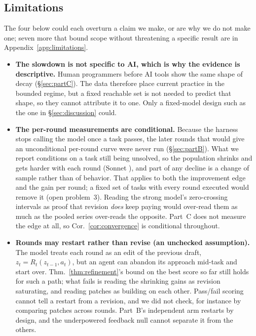 \documentclass{article}
\theoremstyle{remark}
\theoremstyle{plain}
\begin{document}
\subsection{Limitations}
\label{sec:limitations}

The four below could each overturn a claim we make, or are why we do not make one; seven more that bound scope without threatening a specific result are in Appendix~\ref{app:limitations}.

\begin{itemize}[leftmargin=*,itemsep=1pt]
    \item \textbf{The slowdown is not specific to AI, which is why the evidence is descriptive.} Human programmers before AI tools show the same shape of decay (\S\ref{sec:partC}). The data therefore place current practice in the bounded regime, but a fixed reachable set is not needed to predict that shape, so they cannot attribute it to one. Only a fixed-model design such as the one in \S\ref{sec:discussion} could.
    \item \textbf{The per-round measurements are conditional.} Because the harness stops calling the model once a task passes, the later rounds that would give an unconditional per-round curve were never run (\S\ref{sec:partB}). What we report conditions on a task still being unsolved, so the population shrinks and gets harder with each round (Sonnet \statPBSonnetHeadroomN), and part of any decline is a change of sample rather than of behavior. That applies to both the improvement edge and the gain per round; a fixed set of tasks with every round executed would remove it (open problem~3). Reading the strong model's zero-crossing intervals as proof that revision \emph{does} keep paying would over-read them as much as the pooled series over-reads the opposite. Part~C does not measure the edge at all, so Cor.~\ref{cor:convergence} is conditional throughout.
    \item \textbf{Rounds may restart rather than revise (an unchecked assumption).} The model treats each round as an edit of the previous draft, $z_t=R_t(z_{t-1},a_t)$, but an agent can abandon its approach mid-task and start over. Thm.~\ref{thm:refinement}'s bound on the best score so far still holds for such a path; what fails is reading the shrinking gains as revision saturating, and reading patches as building on each other. Pass/fail scoring cannot tell a restart from a revision, and we did not check, for instance by comparing patches across rounds. Part~B's independent arm restarts by design, and the underpowered feedback null cannot separate it from the others.

\end{itemize}
\end{document}
